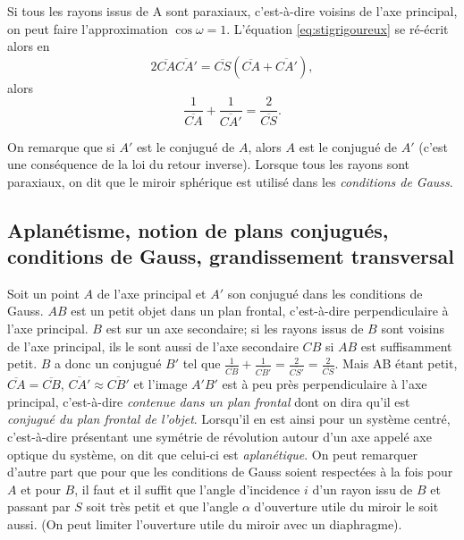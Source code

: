 Si tous les rayons issus de A sont paraxiaux, c'est-à-dire voisins de l'axe principal, on peut faire l'approximation \(\cos \omega = 1\). L'équation \ref{eq:stigrigoureux} se ré-écrit alors en
\begin{equation}
  2 \overline{CA} \overline{CA'} = \overline{CS}(\overline{CA}+ \overline{CA'}),
\end{equation}
alors
\begin{equation}
  \frac{1}{\overline{CA}} + \frac{1}{\overline{CA'}} = \frac{2}{\overline{CS}}.
\end{equation}

On remarque que si \(A'\) est le conjugué de \(A\), alors \(A\) est le conjugué de \(A'\) (c'est une conséquence de la loi du retour inverse). Lorsque tous les rayons sont paraxiaux, on dit que le miroir sphérique est utilisé dans les \emph{conditions de Gauss}.

\subsection{Aplanétisme, notion de plans conjugués, conditions de Gauss, grandissement transversal}
\label{chap7-subsec:aplanetisme}

Soit un point \(A\) de l'axe principal et \(A'\) son conjugué dans les conditions de Gauss. \(AB\) est un petit objet dans un plan frontal, c'est-à-dire perpendiculaire à l'axe principal. \(B\) est sur un axe secondaire; si les rayons issus de \(B\) sont voisins de l'axe principal, ils le sont aussi de l'axe secondaire \(CB\) si \(AB\) est suffisamment petit. \(B\) a donc un conjugué \(B'\) tel que \(\frac{1}{\overline{CB}}+\frac{1}{\overline{CB'}} = \frac{2}{\overline{CS'}} = \frac{2}{\overline{CS}}\). Mais AB étant petit, \(\overline{CA}=\overline{CB}\), \(\overline{CA'} \approx \overline{CB'}\) et l'image \(A'B'\) est à peu près perpendiculaire à l'axe principal, c'est-à-dire \emph{contenue dans un plan frontal} dont on dira qu'il est \emph{conjugué du plan frontal de l'objet}.
Lorsqu'il en est ainsi pour un système centré, c'est-à-dire présentant une symétrie de révolution autour d'un axe appelé axe optique du système, on dit que celui-ci est \emph{aplanétique}.
On peut remarquer d'autre part que pour que les conditions de Gauss soient respectées à la fois pour \(A\) et pour \(B\), il faut et il suffit que l'angle d'incidence \(i\) d'un rayon issu de \(B\) et passant par \(S\) soit très petit et que l'angle \(\alpha\) d'ouverture utile du miroir le soit aussi. (On peut limiter l'ouverture utile du miroir avec un diaphragme).

